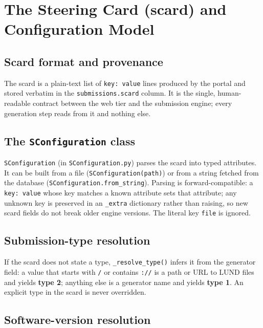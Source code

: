 \section{The Steering Card (scard) and Configuration Model}\label{ch:4}

\subsection{Scard format and provenance}

The scard is a plain-text list of \texttt{key:\allowbreak{} value} lines produced by the portal and stored
verbatim in the \texttt{submissions.\allowbreak{}scard} column. It is the single, human-readable contract
between the web tier and the submission engine; every generation step reads from it and nothing else.

\subsection{The \texttt{SConfiguration} class}

\texttt{SConfiguration} (in \texttt{SConfiguration.\allowbreak{}py}) parses the scard into typed attributes. It
can be built from a file (\texttt{SConfiguration(path)}) or from a string fetched from the database
(\texttt{SConfiguration.\allowbreak{}from\_\allowbreak{}string}). Parsing is forward-compatible: a
\texttt{key:\allowbreak{} value} whose key matches a known attribute sets that attribute; any unknown key is
preserved in an \texttt{\_\allowbreak{}extra} dictionary rather than raising, so new scard fields do not break
older engine versions. The literal key \texttt{file} is ignored.

\subsection{Submission-type resolution}

If the scard does not state a type, \texttt{\_\allowbreak{}resolve\_\allowbreak{}type()} infers it from the
generator field: a value that starts with \texttt{/\allowbreak{}} or contains
\texttt{:\allowbreak{}/\allowbreak{}/\allowbreak{}} is a path or URL to LUND files and yields \textbf{type 2};
anything else is a generator name and yields \textbf{type 1}. An explicit type in the scard is never
overridden.

\subsection{Software-version resolution}

